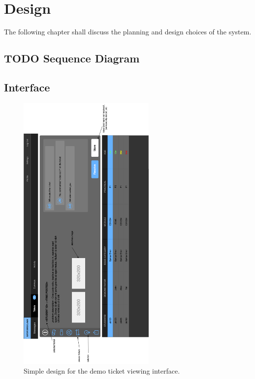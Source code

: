 \chapter{Design}
The following chapter shall discuss the planning and design choices of the system. 

\newpage
\section{TODO Sequence Diagram}

\newpage
\section{Interface}

\begin{figure}[H]
    \centering
    \includegraphics[width=0.6\textwidth]{7design/images/demoTickets.png}
    \caption{Simple design for the demo ticket viewing interface.}
    \label{fig:demoTickets}
\end{figure}

